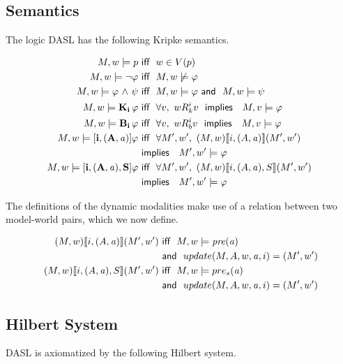 \subsection{Semantics}
The logic DASL has the following Kripke semantics.
\begin{tcolorbox}
	\begin{align*}
	M,w \models p  &\iiff w \in V(p) \\
	M,w \models \tlnot \varphi  &\iiff M,w \not\models \varphi \\ 
	M,w \models \varphi \tland \psi &\iiff M,w \models \varphi \aand M,w \models \psi \\
	M,w \models \Kns{i}\varphi &\iiff \forall v,\ w\Rel{k}^i v\ \timplies\ M,v \models \varphi \\
	M,w \models \Bels{i}\varphi &\iiff \forall v,\ w\Rel{b}^i v\ \timplies\ M,v \models \varphi \\
	M,w \models \Pal{i,(A,\laa)}\varphi &\iiff \forall M',w',\  (M,w) \llbracket i,(A,\laa) \rrbracket (M',w')\ \\&\timplies\ M',w' \models \varphi \\
	M,w \models \Pal{i,(A,\laa),S}\varphi &\iiff \forall M',w',\  (M,w) \llbracket i,(A,\laa),S \rrbracket (M',w')\ \\&\timplies\ M',w' \models \varphi 
	\end{align*}
\end{tcolorbox}
The definitions of the dynamic modalities make use of a relation between two model-world pairs, which we now define.
\begin{tcolorbox}
	\begin{align*}
	(M,w)\llbracket i,(A,\mathit{a})\rrbracket (M',w') &\textsf{\ iff \ } M,w \models \mathit{pre}(\mathit{a}) \\&\textsf{\ and \ } update(M,A,w,\mathit{a},i) = (M',w') \\
	(M,w)\llbracket i, (A,\mathit{a}),S \rrbracket (M',w') &\textsf{\ iff \ } M,w \models pre_s(\mathit{a}) \\&\textsf{\ and \ } update(M,A,w,\mathit{a}, i) = (M',w') 
	\end{align*}
\end{tcolorbox}


\subsection{Hilbert System}
DASL is axiomatized by the following Hilbert system.\\

